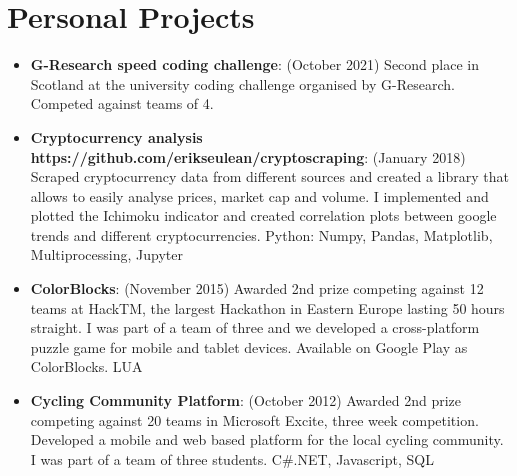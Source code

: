 \documentclass[letterpaper,11pt]{article}
\newcommand{\resumeItem}[2]{
  \item\small{
    \textbf{#1}{: #2 \vspace{-1pt}}
  }
}
\newcommand{\resumeSubItem}[2]{\resumeItem{#1}{#2}\vspace{-5pt}}
\newcommand{\resumeSubHeadingListStart}{\begin{itemize}[leftmargin=*]}
\newcommand{\resumeSubHeadingListEnd}{\end{itemize}}
\begin{document}
\section{Personal Projects}
  \resumeSubHeadingListStart
    \resumeSubItem {G-Research speed coding challenge}
    {(October 2021) Second place in Scotland at the university coding challenge organised by G-Research. Competed against teams of 4.}
    \resumeSubItem {Cryptocurrency analysis https://github.com/erikseulean/cryptoscraping}
    {(January 2018) Scraped cryptocurrency data from different sources and created a library that allows to easily analyse prices, market cap and volume. I implemented and plotted the Ichimoku indicator and created correlation plots between google trends and different cryptocurrencies. Python: Numpy, Pandas, Matplotlib, Multiprocessing, Jupyter}
    \resumeSubItem{ColorBlocks}
      {(November 2015) Awarded 2nd prize competing against 12 teams at HackTM, the largest Hackathon in Eastern Europe lasting 50 hours straight. I was part of a team of three and we developed a cross-platform puzzle game for mobile and tablet devices. Available on Google Play as ColorBlocks. LUA}
    \resumeSubItem{Cycling Community Platform}
    	{(October 2012) Awarded 2nd prize competing against 20 teams in Microsoft Excite, three week competition. Developed a mobile and web based platform for the local cycling community. I was part of a team of three students. C\#.NET, Javascript, SQL}
  \resumeSubHeadingListEnd
\end{document}
